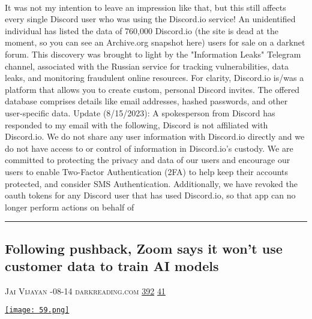 \documentclass[10pt,a4paper]{article}
\begin{document}
\begin{multicols*}{2}
\paragraph{}
 It was not my intention to leave an impression like that, but this still affects every single Discord user who was using the Discord.io service!
An unidentified individual has listed the data of 760,000 Discord.io (the site is dead at the moment, so you can see an Archive.org snapshot here) users for sale on a darknet forum. This discovery was brought to light by the "Information Leaks" Telegram channel, associated with the Russian service for tracking vulnerabilities, data leaks, and monitoring fraudulent online resources.
For clarity, Discord.io is/was a platform that allows you to create custom, personal Discord invites. The offered database comprises details like email addresses, hashed passwords, and other user-specific data.
Update (8/15/2023): A spokesperson from Discord has responded to my email with the following,
Discord is not affiliated with Discord.io. We do not share any user information with Discord.io directly and we do not have access to or control of information in Discord.io's custody.
We are committed to protecting the privacy and data of our users and encourage our users to enable Two-Factor Authentication (2FA) to help keep their accounts protected, and consider SMS Authentication.
Additionally, we have revoked the oauth tokens for any Discord user that has used Discord.io, so that app can no longer perform actions on behalf of 
\par\noindent\textcolor{red}{\rule{\linewidth}{0.2mm}}
\vfill
\null
\noindent\begin{minipage}{\linewidth}
\subsection{Following pushback, Zoom says it won't use customer data to train AI models}
\textsc{\footnotesize
{\scriptsize\faUser}\space 
Jai Vijayan 
{\scriptsize\faCalendar}-08-14 
{\scriptsize\faGlobe}\space 
darkreading.com 
{\scriptsize\faThumbsOUp}\space 
\href{http://news.ycombinator.com/item?id=37123572\&utm\_term=comment}{392} 
{\scriptsize\faComments}\space 
\href{http://news.ycombinator.com/item?id=37123572\&utm\_term=comment}{41} 
}
\par\medskip\noindent
\href{https://www.darkreading.com/analytics/following-pushback-zoom-says-it-won-t-use-customer-data-to-train-ai-models?utm\_source=hackernewsletter\&utm\_medium=email\&utm\_term=startup\_news}{
    \texttt{[image: 59.png]}
}
\end{minipage}

\end{multicols*}
\end{document}
